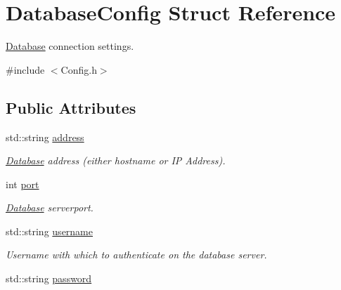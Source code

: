 \hypertarget{structDatabaseConfig}{\section{Database\-Config Struct Reference}
\label{structDatabaseConfig}
}


\hyperlink{classDatabase}{Database} connection settings.  




{\ttfamily \#include $<$Config.\-h$>$}

\subsection*{Public Attributes}
\begin{DoxyCompactItemize}
\item 
\hypertarget{structDatabaseConfig_a5ab15d9f2af8a31b83b6b95e58a0b67f}{std\-::string \hyperlink{structDatabaseConfig_a5ab15d9f2af8a31b83b6b95e58a0b67f}{address}}\label{structDatabaseConfig_a5ab15d9f2af8a31b83b6b95e58a0b67f}

\begin{DoxyCompactList}\small\item\em \hyperlink{classDatabase}{Database} address (either hostname or I\-P Address). \end{DoxyCompactList}\item 
\hypertarget{structDatabaseConfig_acbfdca1789c2780268c7d81f16a023f5}{int \hyperlink{structDatabaseConfig_acbfdca1789c2780268c7d81f16a023f5}{port}}\label{structDatabaseConfig_acbfdca1789c2780268c7d81f16a023f5}

\begin{DoxyCompactList}\small\item\em \hyperlink{classDatabase}{Database} serverport. \end{DoxyCompactList}\item 
\hypertarget{structDatabaseConfig_adefbb4c4d1e1754918dcad998d9e9164}{std\-::string \hyperlink{structDatabaseConfig_adefbb4c4d1e1754918dcad998d9e9164}{username}}\label{structDatabaseConfig_adefbb4c4d1e1754918dcad998d9e9164}

\begin{DoxyCompactList}\small\item\em Username with which to authenticate on the database server. \end{DoxyCompactList}\item 
\hypertarget{structDatabaseConfig_aa17e906c33a2f1c2d1508afa50957b35}{std\-::string \hyperlink{structDatabaseConfig_aa17e906c33a2f1c2d1508afa50957b35}{password}}\label{structDatabaseConfig_aa17e906c33a2f1c2d1508afa50957b35}


\end{DoxyCompactItemize}
